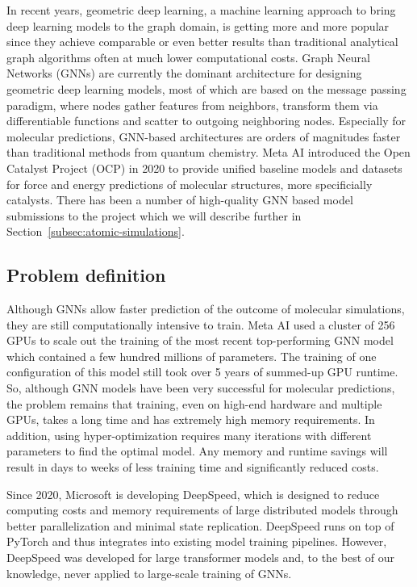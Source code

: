 In recent years, geometric deep learning, a machine learning approach to bring deep learning models 
to the graph domain, is getting more and more popular since they achieve comparable or even better 
results than traditional analytical graph algorithms often at much lower computational costs. Graph Neural 
Networks (GNNs) are currently the dominant architecture for designing geometric deep learning models, most of
which are based on the message passing paradigm, where nodes gather features from neighbors, transform them via 
differentiable functions and scatter to outgoing neighboring nodes. Especially for molecular predictions, 
GNN-based architectures are orders of magnitudes faster than traditional methods from quantum chemistry. 
Meta AI introduced the Open Catalyst Project (OCP) \cite{Chanussot_2021} in 2020 to provide unified baseline models and datasets for 
force and energy predictions of molecular structures, more specificially catalysts. There has been a number 
of high-quality GNN based model submissions 
\cite*{DBLP:journals/corr/abs-2003-03123, https://doi.org/10.48550/arxiv.2106.08903, https://doi.org/10.48550/arxiv.2203.09697} to the project which we will describe further in 
Section~\ref{subsec:atomic-simulations}.

\subsection{Problem definition}

Although GNNs allow faster prediction of the outcome of molecular simulations, they are still computationally intensive 
to train. Meta AI used a cluster of 256 GPUs to scale out the training of the most recent top-performing GNN model 
which contained a few hundred millions of parameters. The training of one configuration of this model still took over 5 
years of summed-up GPU runtime. So, although GNN models have been very successful for molecular predictions, 
the problem remains that training, even on high-end hardware and multiple GPUs, takes a long time and has extremely 
high memory requirements. In addition, using hyper-optimization requires many iterations with different parameters to 
find the optimal model. Any memory and runtime savings will result in days to weeks of less training time and significantly 
reduced costs.

Since 2020, Microsoft is developing DeepSpeed, which is designed to reduce computing costs and memory 
requirements of large distributed models through better parallelization and minimal state replication. DeepSpeed 
runs on top of PyTorch and thus integrates into existing model training pipelines. However, DeepSpeed was developed 
for large transformer models and, to the best of our knowledge, never applied to large-scale training of GNNs.

